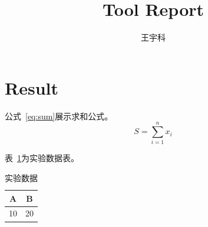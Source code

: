 \documentclass{article}
\begin{document}
\title{Tool Report}
\author{王宇科 }
\maketitle

\section{Result}

公式~\eqref{eq:sum}展示求和公式。
\begin{equation}
\label{eq:sum}
S = \sum_{i=1}^{n} x_i
\end{equation}

表~\ref{tab:data}为实验数据表。
\begin{table}[h]
\centering
\caption{实验数据}
\label{tab:data}
\begin{tabular}{|c|c|}
\hline
A & B \\
\hline
10 & 20 \\
\hline
\end{tabular}
\end{table}
\end{document}
